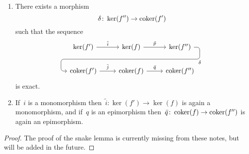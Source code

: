 \begin{lemma}
  \begin{enumerate}
    \item
      There exists a morphism
      \[
                \delta
        \colon  \ker(f'')
        \to     \operatorname{coker}(f')
      \]
      such that the sequence
      \begin{equation}
        \label{induced snake}
        \begin{tikzcd}
            \ker(f')
            \arrow{r}[above]{\tilde{i}}
          & \ker(f)
            \arrow{r}[above]{\tilde{p}}
            \arrow[d, phantom, ""{coordinate, name=Z}]
          & \ker(f'')
            \arrow[ dll,
                    "\delta",
                    rounded corners,
                    to path={ -- ([xshift=2ex]\tikztostart.east)
                              |- (Z) \tikztonodes
                              -| ([xshift=-2ex]\tikztotarget.west)
                              -- (\tikztotarget)}
                  ]
          \\
            \coker(f')
            \arrow{r}[above]{\bar{j}}
          & \coker(f)
            \arrow{r}[above]{\bar{q}}
          & \coker(f'')
        \end{tikzcd}
      \end{equation}
      is exact.
    \item
      \label{snake inherits mono epi}
      If~$i$ is a monomorphism then~$\tilde{i} \colon \ker(f') \to \ker(f)$ is again a monomorphism, and if~$q$ is an epimorphism then~$\bar{q} \colon \operatorname{coker}(f) \to \operatorname{coker}(f'')$ is again an epimorphism.
  \end{enumerate}
\end{lemma}


\begin{proof}
  The proof of the snake lemma is currently missing from these notes, but will be added in the future.
\end{proof}


